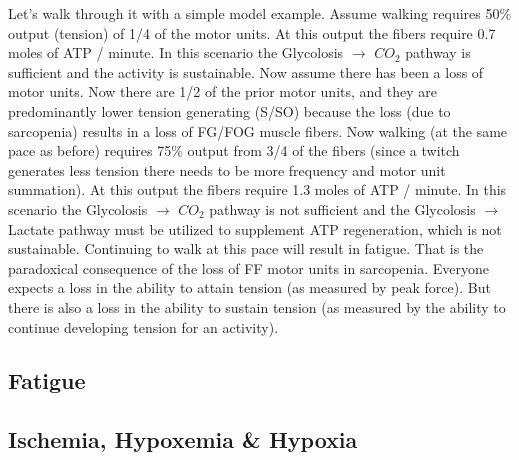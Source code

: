 Let's walk through it with a simple model example. Assume walking requires 50\% output (tension) of 1/4 of the motor units. At this output the fibers require 0.7 moles of ATP / minute. In this scenario the Glycolosis $\rightarrow$ $CO_2$ pathway is sufficient and the activity is sustainable. Now assume there has been a loss of motor units. Now there are 1/2 of the prior motor units, and they are predominantly lower tension generating (S/SO) because the loss (due to sarcopenia) results in a loss of FG/FOG muscle fibers. Now walking (at the same pace as before) requires 75\% output from 3/4 of the fibers (since a twitch generates less tension there needs to be more frequency and motor unit summation). At this output the fibers require 1.3 moles of ATP / minute. In this scenario the Glycolosis $\rightarrow$ $CO_2$ pathway is not sufficient and the Glycolosis $\rightarrow$ Lactate pathway must be utilized to supplement ATP regeneration, which is not sustainable. Continuing to walk at this pace will result in fatigue. That is the paradoxical consequence of the loss of FF motor units in sarcopenia. Everyone expects a loss in the ability to attain tension (as measured by peak force). But there is also a loss in the ability to sustain tension (as measured by the ability to continue developing tension for an activity).


\subsection{Fatigue}

\subsection{Ischemia, Hypoxemia \& Hypoxia}

